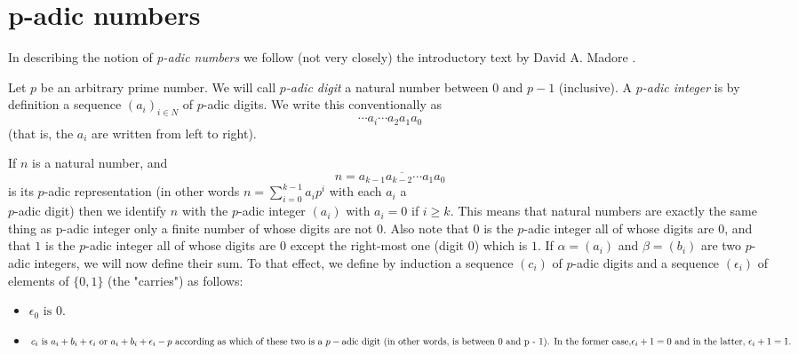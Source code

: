 \documentclass{llncs}
\begin{document}
\section{p-adic numbers} 

In describing the notion of {\em p-adic numbers} we follow (not very closely) the introductory text by David A. Madore \cite{M00}. 

Let $p$ be an arbitrary prime number.
We will call {\em $p$-adic digit} a natural number between $0$ and $p-1$ (inclusive). A
{\em $p$-adic integer} is by definition a sequence $(a_i)_{i \in N}$ of $p$-adic digits. We write this
conventionally as
$$
\cdots a_i \cdots  a_2 a_1 a_0
$$
(that is, the $a_i$ are written from left to right).

If $n$ is a natural number, and
$$
n = \overline{a_{k-1} a_{k-2} \cdots  a_1 a_0}
$$
is its $p$-adic representation (in other words 
$n = \sum ^{k-1}_{i=0}  a_ip^i$ with each $a_i$ a\\ $p$-adic
digit) then we identify $n$ with the $p$-adic integer $(a_i)$ with $a_i = 0$ if $i \geq k$. This
means that natural numbers are exactly the same thing as p-adic integer only a
finite number of whose digits are not $0$. Also note that $0$ is the $p$-adic integer all of
whose digits are $0$, and that $1$ is the $p$-adic integer all of whose digits are $0$ except
the right-most one (digit $0$) which is $1$.
If $\alpha  = (a_i)$ and $\beta = (b_i)$ are two $p$-adic integers, we will now define their
sum. To that effect, we define by induction a sequence $(c_i)$ of $p$-adic digits and a
sequence $(\epsilon _i)$ of elements of $\{0, 1\}$ (the "carries") as follows:\\


\begin{itemize}
  \item  $\epsilon _0 \mbox{ is } 0.$\\
  \item  $c_i \mbox{ is } a_i + b_i + \epsilon _i \mbox{ or } a_i + b_i + \epsilon _i - p \mbox{ according as which of these two is a }\\
p-\mbox{adic digit (in other words, is between 0 and p - 1). In the former case,}\\
\epsilon _i+1 = 0 \mbox{ and in the latter, } \epsilon _i+1 = 1.$
\end{itemize}
\end{document}
